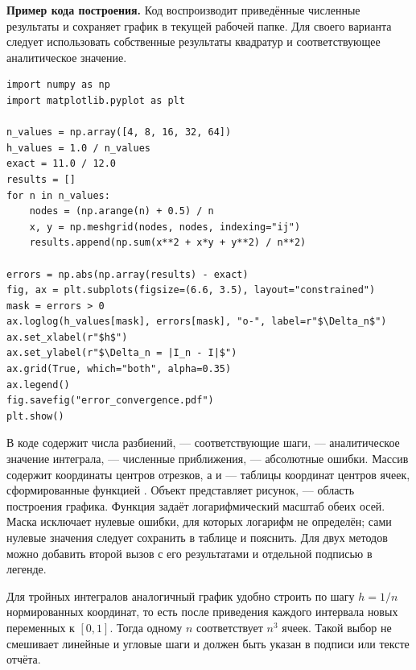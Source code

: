 \documentclass[12pt,a4paper]{article}
\begin{document}
\textbf{Пример кода построения.}
Код воспроизводит приведённые численные результаты и сохраняет график
в текущей рабочей папке. Для своего варианта следует использовать собственные
результаты квадратур и соответствующее аналитическое значение.
\begin{lstlisting}[style=commands]
import numpy as np
import matplotlib.pyplot as plt

n_values = np.array([4, 8, 16, 32, 64])
h_values = 1.0 / n_values
exact = 11.0 / 12.0
results = []
for n in n_values:
    nodes = (np.arange(n) + 0.5) / n
    x, y = np.meshgrid(nodes, nodes, indexing="ij")
    results.append(np.sum(x**2 + x*y + y**2) / n**2)

errors = np.abs(np.array(results) - exact)
fig, ax = plt.subplots(figsize=(6.6, 3.5), layout="constrained")
mask = errors > 0
ax.loglog(h_values[mask], errors[mask], "o-", label=r"$\Delta_n$")
ax.set_xlabel(r"$h$")
ax.set_ylabel(r"$\Delta_n = |I_n - I|$")
ax.grid(True, which="both", alpha=0.35)
ax.legend()
fig.savefig("error_convergence.pdf")
plt.show()
\end{lstlisting}
В коде  содержит числа разбиений,  ---
соответствующие шаги,  --- аналитическое значение интеграла,
 --- численные приближения,  --- абсолютные ошибки.
Массив  содержит координаты центров отрезков,
а  и  --- таблицы координат центров ячеек,
сформированные функцией .
Объект  представляет рисунок,  --- область построения графика.
Функция  задаёт логарифмический масштаб обеих осей.
Маска  исключает нулевые ошибки, для которых логарифм
не определён; сами нулевые значения следует сохранить в таблице и пояснить.
Для двух методов можно добавить второй вызов  с его
результатами и отдельной подписью в легенде.

Для тройных интегралов аналогичный график удобно строить по шагу
$h=1/n$ нормированных координат, то есть после приведения каждого интервала
новых переменных к $[0,1]$. Тогда одному $n$ соответствует $n^3$ ячеек.
Такой выбор не смешивает линейные и угловые шаги и должен быть указан
в подписи или тексте отчёта.

\clearpage
\end{document}
